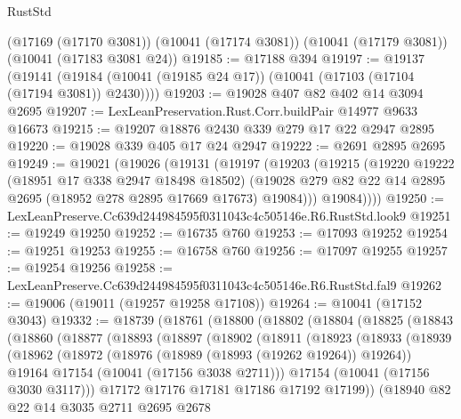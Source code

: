\begin{lexlean}{RustStd}
\begin{coremodule}
    (@17169 (@17170 @3081))
    (@10041 (@17174 @3081))
    (@10041 (@17179 @3081))
    (@10041 (@17183 @3081 @24))
@19185 := @17188 @394
@19197 := @19137
    (@19141 (@19184 (@10041 (@19185 @24 @17)) (@10041 (@17103 (@17104 (@17194 @3081)) @2430))))
@19203 := @19028 @407 @82 @402 @14 @3094 @2695
@19207 := LexLeanPreservation.Rust.Corr.buildPair @14977 @9633 @16673
@19215 := @19207 @18876 @2430 @339 @279 @17 @22 @2947 @2895
@19220 := @19028 @339 @405 @17 @24 @2947
@19222 := @2691 @2895 @2695
@19249 := @19021
    (@19026
      (@19131
        (@19197
          (@19203
            (@19215
              (@19220
                @19222
                (@18951 @17 @338 @2947 @18498 @18502)
                (@19028 @279 @82 @22 @14 @2895 @2695 (@18952 @278 @2895 @17669 @17673) @19084)))
            @19084))))
@19250 := LexLeanPreserve.Cc639d244984595f0311043c4c505146e.R6.RustStd.look9
@19251 := @19249 @19250
@19252 := @16735 @760
@19253 := @17093 @19252
@19254 := @19251 @19253
@19255 := @16758 @760
@19256 := @17097 @19255
@19257 := @19254 @19256
@19258 := LexLeanPreserve.Cc639d244984595f0311043c4c505146e.R6.RustStd.fal9
@19262 := @19006 (@19011 (@19257 @19258 @17108))
@19264 := @10041 (@17152 @3043)
@19332 := @18739
    (@18761
      (@18800
        (@18802
          (@18804
            (@18825
              (@18843
                (@18860
                  (@18877
                    (@18893
                      (@18897
                        (@18902
                          (@18911
                            (@18923
                              (@18933
                                (@18939
                                  (@18962
                                    (@18972
                                      (@18976 (@18989 (@18993 (@19262 @19264)) @19264))
                                      @19164
                                      @17154
                                      (@10041 (@17156 @3038 @2711)))
                                    @17154
                                    (@10041 (@17156 @3030 @3117)))
                                  @17172
                                  @17176
                                  @17181
                                  @17186
                                  @17192
                                  @17199))
                              (@18940
                                @82
                                @22
                                @14
                                @3035
                                @2711
                                @2695
                                @2678

\end{coremodule}
\end{lexlean}
